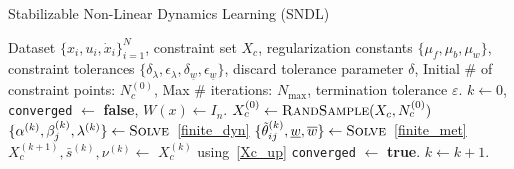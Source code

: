 \documentclass[conference]{svproc}
\newcommand{\wl}{\underline{w}}
\newcommand{\wu}{\overline{w}}
\newcommand{\xs}{x_i}
\newcommand{\us}{u_i}
\begin{document}
\begin{algorithm}[h!]
  \caption{Stabilizable Non-Linear Dynamics Learning (SNDL)}
  \label{alg:final}
  \begin{algorithmic}[1]
   Dataset $\{\xs,\us,\dot{x}_i\}_{i=1}^{N}$, constraint set $X_c$, regularization constants $\{\mu_f,\mu_b,\mu_w\}$, constraint tolerances $\{\delta_\lambda,\epsilon_\lambda,\delta_{\wl},\epsilon_{\wl} \}$, discard tolerance parameter $\delta$, Initial \# of constraint points: $N_c^{(0)}$, Max \# iterations: $N_{\max}$, termination tolerance $\varepsilon$. 
   \State $k \leftarrow 0$, \texttt{converged} $\leftarrow$ \textbf{false}, $W(x) \leftarrow I_n$.
   \State $X_c^{(0)} \leftarrow \textproc{RandSample}(X_c,N_c^{(0)})$ \label{line:rand_samp_init}
    \State $\{\alpha^{(k)}, \beta_j^{(k)}, \lambda^{(k)} \} \leftarrow \textproc{Solve}$~\eqref{finite_dyn}
    \State $\{\tilde{\theta}_{ij}^{(k)},\wl,\wu\} \leftarrow \textproc{Solve}$~\eqref{finite_met}
    \State $X_c^{(k+1)}, \bar{s}^{(k)}, \nu^{(k)} \leftarrow$  $X_c^{(k)}$ using~\eqref{Xc_up}
    \If{$\Delta < \varepsilon$ \textbf{or} $\nu^{(k)}(\xs) < \varepsilon \quad \forall \xs \in X_c$}
        \State \texttt{converged} $\leftarrow$ \textbf{true}.
    \EndIf
    \State $k \leftarrow k + 1$.
  \EndWhile
      \end{algorithmic}
\end{algorithm} 
\end{document}
